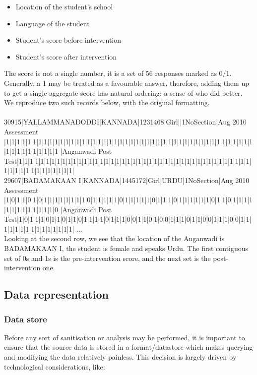 \documentclass[10pt]{article}
\begin{document}
\begin{itemize}
\item Location of the student's school
\item Language of the student
\item Student's score before intervention
\item Student's score after intervention
\end{itemize}

The score is not a single number, it is a set of 56 responses marked as 0/1. Generally, a 1 may be treated as a favourable answer, therefore, adding them up to get a single aggregate score has natural ordering: a sense of who did better. We reproduce two such records below, with the original formatting.\\\\
{\footnotesize
30915|YALLAMMANADODDI|KANNADA|1231468|Girl||1NoSection|Aug 2010 Assessment
|1|1|1|1|1|1|1|1|1|1|1|1|1|1|1|1|1|1|1|1|1|1|1|1|1|1|1|1|1|1|1|1|1|1|1|1|1|1|1|1|1|1|1|1|1|1|1|1|1|1|1|1|1|1|1|1
|Anganwadi Post Test|1|1|1|1|1|1|1|1|1|1|1|1|1|1|1|1|1|1|1|1|1|1|1|1|1|1|1|1|1|1|1|1|1|1|1|1|1|1|1|1|1|1|1|1|1|1|1|1|1|1|1|1|1|1|1|1|}\\

{\footnotesize 29607|BADAMAKAAN I|KANNADA|1445172|Girl|URDU|1NoSection|Aug 2010 Assessment
|1|0|1|1|0|1|0|1|1|1|1|1|1|1|1|0|1|1|1|1|1|0|1|1|1|1|1|0|1|1|1|0|1|1|1|1|1|1|0|1|1|0|1|1|1|1|1|1|1|1|1|1|1|1|1|0
|Anganwadi Post Test|1|0|1|1|1|0|1|1|0|1|1|0|1|1|1|1|0|1|1|1|0|0|1|1|0|1|0|0|1|1|1|0|1|1|0|0|1|1|1|0|0|1|1|1|1|1|1|1|1|1|1|1|1|1|1|1|
...
}\\

Looking at the second row, we see that the location of the Anganwadi is BADAMAKAAN I, the student is female and speaks Urdu. The first contiguous set of 0s and 1s is the pre-intervention score, and the next set is the post-intervention one.

\subsection{Data representation}
\subsubsection{Data store}
Before any sort of sanitisation or analysis may be performed, it is important to ensure that the source data is stored in a format/datastore which makes querying and modifying the data relatively painless. This decision is largely driven by technological considerations, like:
\end{document}
